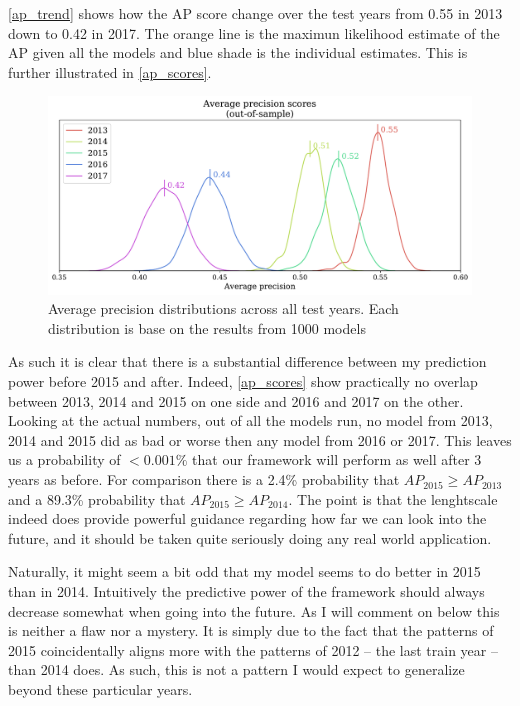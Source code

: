 \documentclass[a4paper]{article}
\begin{document}
\autoref{ap_trend} shows how the AP score change over the test years from 0.55 in 2013 down to 0.42 in 2017. The orange line is the maximun likelihood estimate of the AP given all the models and blue shade is the individual estimates. This is further illustrated in \autoref{ap_scores}.\par


\begin{figure}[!htb]
	\centering
	\includegraphics[scale=0.47]{ap_scores.pdf}
    \caption{\footnotesize{Average precision distributions across all test years. Each distribution is base on the results from 1000 models}}\label{ap_scores}
\end{figure}

As such it is clear that there is a substantial difference between my prediction power before 2015 and after. Indeed, \autoref{ap_scores} show practically no overlap between 2013, 2014 and 2015 on one side and 2016 and 2017 on the other. Looking at the actual numbers, out of all the models run, no model from 2013, 2014 and 2015 did as bad or worse then any model from 2016 or 2017. This leaves us a probability of $<0.001\%$ that our framework will perform as well after 3 years as before. For comparison there is a 2.4\% probability that $AP_{2015} \geq AP_{2013}$ and a 89.3\% probability that $AP_{2015} \geq AP_{2014}$. The point is that the lenghtscale indeed does provide powerful guidance regarding how far we can look into the future, and it should be taken quite seriously doing any real world application.\par

Naturally, it might seem a bit odd that my model seems to do better in 2015 than in 2014. Intuitively the predictive power of the framework should always decrease somewhat when going into the future. As I will comment on below this is neither a flaw nor a mystery. It is simply due to the fact that the patterns of 2015 coincidentally aligns more with the patterns of 2012 -- the last train year -- than 2014 does. As such, this is not a pattern I would expect to generalize beyond these particular years.\par 
\end{document}
